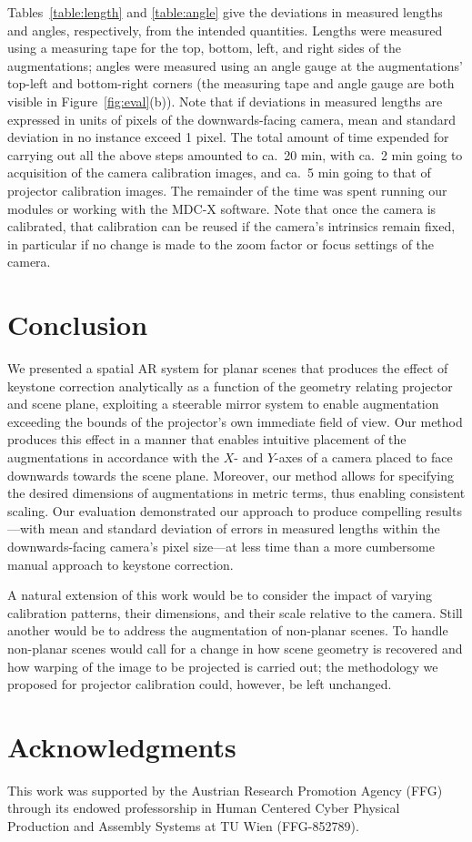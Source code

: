 \documentclass[review]{elsarticle}
\begin{document}
Tables~\ref{table:length} and \ref{table:angle} give the deviations in measured lengths and angles, respectively, from the intended quantities. Lengths were measured using a measuring tape for the top, bottom, left, and right sides of the augmentations; angles were measured using an angle gauge at the augmentations' top-left and bottom-right corners (the measuring tape and angle gauge are both visible in Figure~\ref{fig:eval}(b)). Note that if deviations in measured lengths are expressed in units of pixels of the downwards-facing camera, mean and standard deviation in no instance exceed 1 pixel. The total amount of time expended for carrying out all the above steps amounted to ca.\ 20 min, with ca.\ 2 min going to acquisition of the camera calibration images, and ca.\ 5 min going to that of projector calibration images. The remainder of the time was spent running our modules or working with the MDC-X software. Note that once the camera is calibrated, that calibration can be reused if the camera's intrinsics remain fixed, in particular if no change is made to the zoom factor or focus settings of the camera.

\section{Conclusion}

We presented a spatial AR system for planar scenes that produces the effect of keystone correction analytically as a function of the geometry relating projector and scene plane, exploiting a steerable mirror system to enable augmentation exceeding the bounds of the projector's own immediate field of view. Our method produces this effect in a manner that enables intuitive placement of the augmentations in accordance with the $X$- and $Y$-axes of a camera placed to face downwards towards the scene plane. Moreover, our method allows for specifying the desired dimensions of augmentations in metric terms, thus enabling consistent scaling. Our evaluation demonstrated our approach to produce compelling results---with mean and standard deviation of errors in measured lengths within the downwards-facing camera's pixel size---at less time than a more cumbersome manual approach to keystone correction.

A natural extension of this work would be to consider the impact of varying calibration patterns, their dimensions, and their scale relative to the camera. Still another would be to address the augmentation of non-planar scenes. To handle non-planar scenes would call for a change in how scene geometry is recovered and how warping of the image to be projected is carried out; the methodology we proposed for projector calibration could, however, be left unchanged.

\section{Acknowledgments}

This work was supported by the Austrian Research Promotion Agency (FFG) through its endowed professorship in Human Centered Cyber Physical Production and Assembly Systems at TU Wien (FFG-852789).


\end{document}
